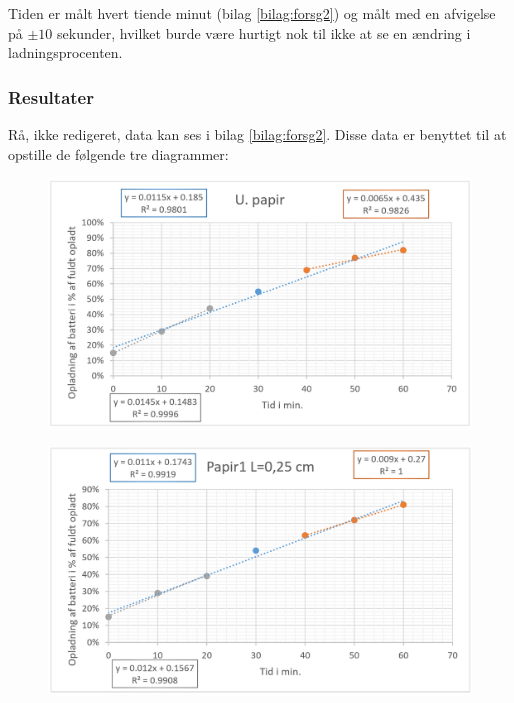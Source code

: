 Tiden er målt hvert tiende minut (bilag \ref{bilag:forsg2}) og målt med en afvigelse på $\pm 10$ sekunder, hvilket burde være hurtigt nok til ikke at se en ændring i ladningsprocenten.

\subsubsection{Resultater}
Rå, ikke redigeret, data kan ses i bilag \ref{bilag:forsg2}. Disse data er benyttet til at opstille de følgende tre diagrammer:

\begin{figure}[H]
\centering
\includegraphics[width=1\textwidth]{Setup/forsg2_graf1}
\caption{}
\label{figure:graf1}
\end{figure}

\begin{figure}[H]
\centering
\includegraphics[width=1\textwidth]{Setup/forsg2_graf2}
\caption{}
\label{figure:graf2}
\end{figure}

